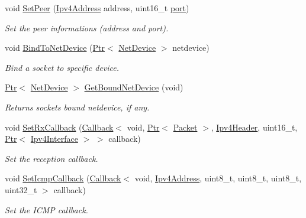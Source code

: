 \begin{DoxyCompactItemize}
void \hyperlink{classns3_1_1Ipv4EndPoint_aa83bdb487bea8b5d9643c3f2efd0289f}{Set\+Peer} (\hyperlink{classns3_1_1Ipv4Address}{Ipv4\+Address} address, uint16\+\_\+t \hyperlink{visualizer-ideas_8txt_a21ff1c530daf8435e00048b7fc2c58e3}{port})
\begin{DoxyCompactList}\small\item\em Set the peer informations (address and port). \end{DoxyCompactList}\item 
void \hyperlink{classns3_1_1Ipv4EndPoint_a0f4a3c34e81be074385dbbb7c19e17b6}{Bind\+To\+Net\+Device} (\hyperlink{classns3_1_1Ptr}{Ptr}$<$ \hyperlink{classns3_1_1NetDevice}{Net\+Device} $>$ netdevice)
\begin{DoxyCompactList}\small\item\em Bind a socket to specific device. \end{DoxyCompactList}\item 
\hyperlink{classns3_1_1Ptr}{Ptr}$<$ \hyperlink{classns3_1_1NetDevice}{Net\+Device} $>$ \hyperlink{classns3_1_1Ipv4EndPoint_a888c2b9d781f6834223c516c1f9f60ae}{Get\+Bound\+Net\+Device} (void)
\begin{DoxyCompactList}\small\item\em Returns socket\textquotesingle{}s bound netdevice, if any. \end{DoxyCompactList}\item 
void \hyperlink{classns3_1_1Ipv4EndPoint_abf5a10aadc249f2ce275cad9bb26322d}{Set\+Rx\+Callback} (\hyperlink{classns3_1_1Callback}{Callback}$<$ void, \hyperlink{classns3_1_1Ptr}{Ptr}$<$ \hyperlink{classns3_1_1Packet}{Packet} $>$, \hyperlink{classns3_1_1Ipv4Header}{Ipv4\+Header}, uint16\+\_\+t, \hyperlink{classns3_1_1Ptr}{Ptr}$<$ \hyperlink{classns3_1_1Ipv4Interface}{Ipv4\+Interface} $>$ $>$ callback)
\begin{DoxyCompactList}\small\item\em Set the reception callback. \end{DoxyCompactList}\item 
void \hyperlink{classns3_1_1Ipv4EndPoint_a96d3a484480565a8f7444eae41caa4b4}{Set\+Icmp\+Callback} (\hyperlink{classns3_1_1Callback}{Callback}$<$ void, \hyperlink{classns3_1_1Ipv4Address}{Ipv4\+Address}, uint8\+\_\+t, uint8\+\_\+t, uint8\+\_\+t, uint32\+\_\+t $>$ callback)
\begin{DoxyCompactList}\small\item\em Set the I\+C\+MP callback. \end{DoxyCompactList}\item 

\end{DoxyCompactItemize}
